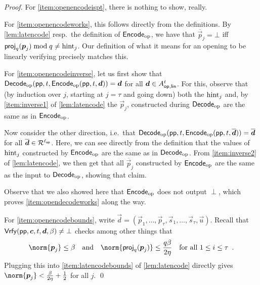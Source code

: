 \begin{proof}
For \autoref{item:openencodeispt}, there is nothing to show, really.

\bigskip\noindent
For \autoref{item:openencodeworks}, this follows directly from the definitions.
By \autoref{lem:latencode} resp.\ the definition of $\mathsf{Encode}_{\mathrm{op}}$, we have that $\overline{\vec{p}}_j = \bot$ iff $\mathsf{proj}_q(\boldsymbol{p}_j) \bmod q \neq \mathrm{hint}_j$.
Our definition of what it means for an opening to be linearly verifying precisely matches this.

\bigskip\noindent
For \autoref{item:openencodeinverse}, let us first show that $\mathsf{Decode}_{\mathrm{op}}(\mathsf{pp}, t, \mathsf{Encode}_{\mathrm{op}}(\mathsf{pp},t, \boldsymbol{d})) = \boldsymbol{d}$ for all $\boldsymbol{d}\in A_{\mathsf{op,lin}}^{t}$.
For this, observe that (by induction over $j$, starting at $j=\tau$ and going down) both the $\mathrm{hint}_j$ and, by \autoref{item:inverse1} of \autoref{lem:latencode} the $\vec{p}_j$, constructed during $\mathsf{Decode}_{\mathrm{op}}$ are the same as in $\mathsf{Encode}_{\mathrm{op}}$.

Now consider the other direction, i.e.\ that $\mathsf{Decode}_{\mathrm{op}}(\mathsf{pp}, t,\mathsf{Encode}_{\mathrm{op}}(\mathsf{pp},t,\overline{\boldsymbol{d}})) = \overline{\boldsymbol{d}}$ for all $\overline{\boldsymbol{d}}\in\mathcal{R}^{{\ell_{\mathsf{op}}}}$.
Here, we can see directly from the definition that the values of $\mathrm{hint}_j$ constructed by $\mathsf{Encode}_{\mathrm{op}}$ are the same as in $\mathsf{Decode}_{\mathrm{op}}$.
From \autoref{item:inverse2} of \autoref{lem:latencode}, we then get that all $\overline{\vec{p}}_j$ constructed by $\mathsf{Encode}_{\mathrm{op}}$ are the same as the input to $\mathsf{Decode}_{\mathrm{op}}$, showing that claim.

Observe that we also showed here that $\mathsf{Encode}_{\mathrm{op}}$ does not output $\perp$, which proves \autoref{item:opendecodeworks} along the way.

\bigskip\noindent
For \autoref{item:openencodebounds}, write $\vec{d} = (\vec{p}_1,\ldots,\vec{p}_\tau,\vec{s}_1,\ldots, \vec{s}_\tau,\vec{u})$.
Recall that $\mathsf{Vrfy}(\mathsf{pp}, \boldsymbol{c},t,\boldsymbol{d},\beta) \neq \bot$ checks among other things that
\[
 \norm{\vec{p}_j} \leq \beta \quad\text{and}\quad \norm{\proj_q(\vec{p}_j)}\leq \frac{q\beta}{2\eta} \quad\text{for all $1\leq i \leq \tau$}\enspace.
\]
Plugging this into \autoref{item:latencodebounds} of \autoref{lem:latencode} directly gives $\norm{\vec{p}_j} < \frac{\beta}{2\eta}+\frac12$ for all $j$.
\qed
\end{proof}


